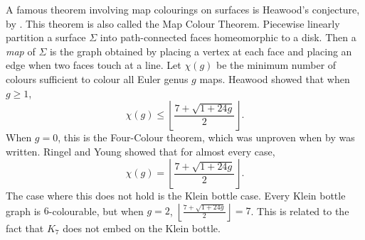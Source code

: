 A famous theorem involving map colourings on surfaces is Heawood's conjecture, by \textcite{heawoodMapcolourTheorem1890}. This theorem is also called the Map Colour Theorem. Piecewise linearly partition a surface $\Sigma$ into path-connected faces homeomorphic to a disk. Then a \textit{map} of $\Sigma$ is the graph obtained by placing a vertex at each face and placing an edge when two faces touch at a line. Let $\chi(g)$ be the minimum number of colours sufficient to colour all Euler genus $g$ maps. Heawood showed that when $g \geq 1$, 
	\begin{equation*}
		\chi(g) \leq \left\lfloor 
		\frac{7 + \sqrt{1 + 24g}}{2}
		\right\rfloor.
	\end{equation*}
When $g = 0$, this is the Four-Colour theorem, which was unproven when  by \textcite{ringelMapColorTheorem1974} was written.  
Ringel and Young \cite{ringelMapColorTheorem1974} showed that for almost every case,
\begin{equation*}
	\chi(g) = \left\lfloor 
	\frac{7 + \sqrt{1 + 24g}}{2}
	\right\rfloor.
\end{equation*}
The case where this does not hold is the Klein bottle case. Every Klein bottle graph is $6$-colourable, but when $g = 2$, $\left\lfloor 
\frac{7 + \sqrt{1 + 24g}}{2}
\right\rfloor = 7$. This is related to the fact that $K_7$ does not embed on the Klein bottle. 
